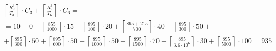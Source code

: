 \begin{gather*}
\begin{multlined}
    \left\lceil\frac{R_9^3}{T_3}\right\rceil\cdot C_3 +%
    \left\lceil\frac{R_9^3}{T_6}\right\rceil\cdot C_6 = \\%
    = 10 + 0 + \left\lceil\frac{855}{1000}\right\rceil\cdot 15 + %
    \left\lceil\frac{895}{100}\right\rceil\cdot 20 + %
    \left\lceil\frac{895 + 215}{700}\right\rceil\cdot 40 + %
    \left\lceil\frac{895}{300}\right\rceil\cdot 50 + \\%
    + \left\lceil\frac{895}{300}\right\rceil\cdot 50 + %
    \left\lceil\frac{895}{600}\right\rceil\cdot 50 + %
    \left\lceil\frac{895}{1000}\right\rceil\cdot 50 +%
    \left\lceil\frac{895}{1500}\right\rceil\cdot 70 +%
    \left\lceil\frac{895}{3.6 \cdot 10^6}\right\rceil\cdot 30 +%
    \left\lceil\frac{895}{5000}\right\rceil\cdot 100 = 935 \\
  \end{multlined} \\
\end{gather*}
